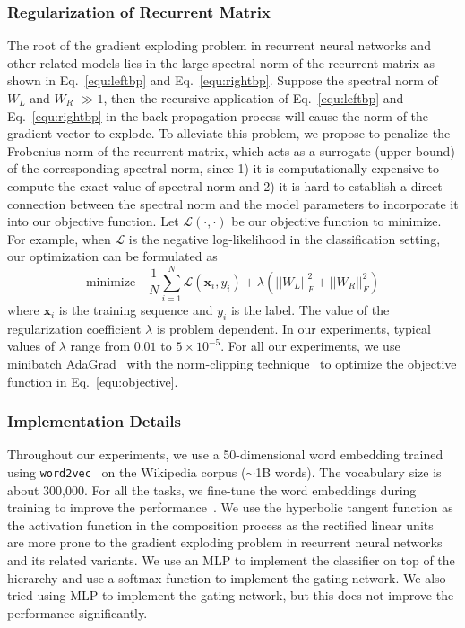 \documentclass{article}
\theoremstyle{definition}
\begin{document}
\subsubsection{Regularization of Recurrent Matrix}
The root of the gradient exploding problem in recurrent neural networks and other related models lies in the large spectral norm of the recurrent matrix as shown in Eq.~\ref{equ:leftbp} and Eq.~\ref{equ:rightbp}. Suppose the spectral norm of $W_L$ and $W_R$ $\gg 1$, then the recursive application of Eq.~\ref{equ:leftbp} and Eq.~\ref{equ:rightbp} in the back propagation process will cause the norm of the gradient vector to explode. To alleviate this problem, we propose to penalize the Frobenius norm of the recurrent matrix, which acts as a surrogate (upper bound) of the corresponding spectral norm, since 1) it is computationally expensive to compute the exact value of spectral norm and 2) it is hard to establish a direct connection between the spectral norm and the model parameters to incorporate it into our objective function. Let $\mathcal{L}(\cdot, \cdot)$ be our objective function to minimize. For example, when $\mathcal{L}$ is the negative log-likelihood in the classification setting, our optimization can be formulated as
\begin{equation}
\text{minimize}\quad \frac{1}{N}\sum_{i=1}^N\mathcal{L}(\mathbf{x}_i, y_i) + \lambda\left(||W_L||_F^2 + ||W_R||_F^2\right)
\label{equ:objective}
\end{equation}
where $\mathbf{x}_i$ is the training sequence and $y_i$ is the label. The value of the regularization coefficient $\lambda$ is problem dependent.  In our experiments, typical values of $\lambda$ range from $0.01$ to $5\times 10^{-5}$. For all our experiments, we use minibatch AdaGrad~\cite{duchi2011adaptive} with the norm-clipping technique~\cite{pascanu2013difficulty} to optimize the objective function in Eq.~\ref{equ:objective}.

\subsubsection{Implementation Details}
Throughout our experiments, we use a 50-dimensional word embedding trained using \texttt{word2vec}~\cite{mikolov2013distributed} on the Wikipedia corpus ($\sim$1B words). The vocabulary size is about 300,000. For all the tasks, we fine-tune the word embeddings during training to improve the performance~\cite{collobert2011natural}. We use the hyperbolic tangent function as the activation function in the composition process as the rectified linear units~\cite{nair2010rectified} are more prone to the gradient exploding problem in recurrent neural networks and its related variants. We use an MLP to implement the classifier on top of the hierarchy and use a softmax function to implement the gating network. We also tried using MLP to implement the gating network, but this does not improve the performance significantly.
\end{document}
